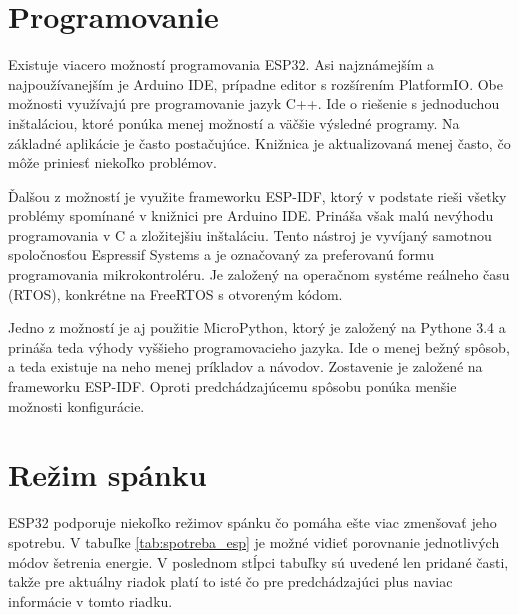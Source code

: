 
\section{Programovanie}

Existuje viacero možností programovania ESP32. Asi najznámejším a najpoužívanejším je Arduino IDE, prípadne editor s rozšírením PlatformIO. Obe možnosti využívajú pre programovanie jazyk C++. Ide o riešenie s jednoduchou inštaláciou, ktoré ponúka menej možností a väčšie výsledné programy. Na základné aplikácie je často postačujúce. Knižnica je aktualizovaná menej často, čo môže priniesť niekoľko problémov.

Ďalšou z možností je využite frameworku ESP-IDF, ktorý v podstate rieši všetky problémy spomínané v knižnici pre Arduino IDE. Prináša však malú nevýhodu programovania v C a zložitejšiu inštaláciu. Tento nástroj je vyvíjaný samotnou spoločnosťou Espressif Systems a je označovaný za preferovanú formu programovania mikrokontroléru. Je založený na operačnom systéme reálneho času (RTOS), konkrétne na FreeRTOS s otvoreným kódom.

Jedno z možností je aj použitie MicroPython, ktorý je založený na Pythone 3.4 a prináša teda výhody vyššieho programovacieho jazyka. Ide o menej bežný spôsob, a teda existuje na neho menej príkladov a návodov. Zostavenie je založené na frameworku ESP-IDF. Oproti predchádzajúcemu spôsobu ponúka menšie možnosti konfigurácie.

\section{Režim spánku}\label{sec:esp-sleep}

ESP32 podporuje niekoľko režimov spánku čo pomáha ešte viac zmenšovať jeho spotrebu. V tabuľke \ref{tab:spotreba_esp} je možné vidieť porovnanie jednotlivých módov šetrenia energie. V poslednom stĺpci tabuľky sú uvedené len pridané časti, takže pre aktuálny riadok platí to isté čo pre predchádzajúci plus naviac informácie v tomto riadku.

